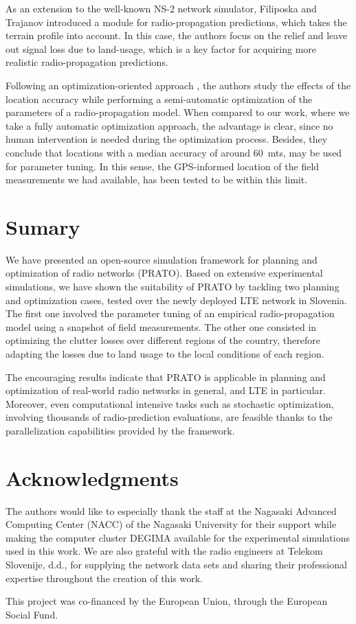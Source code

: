 As an extension to the well-known NS-2 network simulator, Filiposka
and Trajanov \cite{Filiposka_Terrain_aware_three_dimensional_radio_propagation_model_extension_for_NS2:2011}
introduced a module for radio-propagation predictions, which takes
the terrain profile into account. In this case, the authors focus
on the relief and leave out signal loss due to land-usage, which is
a key factor for acquiring more realistic radio-propagation predictions.

Following an optimization-oriented approach \cite{Aarnaes-Tuning_of_empirical_radio_propagation_models_effect_of_location_accuracy:2004},
the authors study the effects of the location accuracy while performing
a semi-automatic optimization of the parameters of a radio-propagation
model. When compared to our work, where we take a fully automatic
optimization approach, the advantage is clear, since no human intervention
is needed during the optimization process. Besides, they conclude
that locations with a median accuracy of around 60~mts, may be used
for parameter tuning. In this sense, the GPS-informed location of
the field measurements we had available, has been tested to be within
this limit.


\section{Sumary}

We have presented an open-source simulation framework for planning
and optimization of radio networks (PRATO). Based on extensive experimental
simulations, we have shown the suitability of PRATO by tackling two
planning and optimization cases, tested over the newly deployed LTE
network in Slovenia. The first one involved the parameter tuning of
an empirical radio-propagation model using a snapshot of field measurements.
The other one consisted in optimizing the clutter losses over different
regions of the country, therefore adapting the losses due to land
usage to the local conditions of each region.

The encouraging results indicate that PRATO is applicable in planning
and optimization of real-world radio networks in general, and LTE
in particular. Moreover, even computational intensive tasks such as
stochastic optimization, involving thousands of radio-prediction evaluations,
are feasible thanks to the parallelization capabilities provided by
the framework.


\section*{Acknowledgments}

The authors would like to especially thank the staff at the Nagasaki
Advanced Computing Center (NACC) of the Nagasaki University for their
support while making the computer cluster DEGIMA available for the
experimental simulations used in this work. We are also grateful with
the radio engineers at Telekom Slovenije, d.d., for supplying the
network data sets and sharing their professional expertise throughout
the creation of this work.

This project was co-financed by the European Union, through the European
Social Fund.
